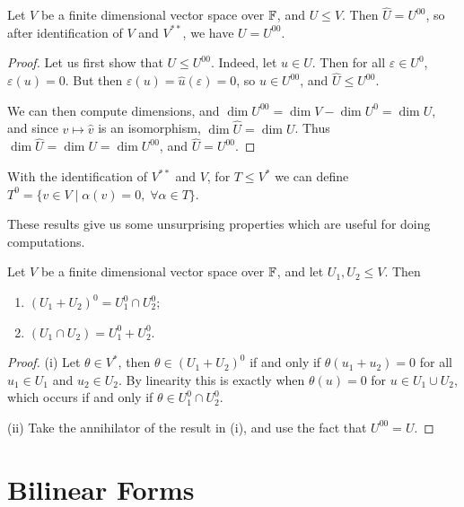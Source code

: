 \documentclass[a4paper]{scrartcl}
\begin{document}
\begin{lemma}
    Let $V$ be a finite dimensional vector space over $\mathbb{F}$, and $U \leq V$. Then
    $\hat{U} = U^{00}$, so after identification of $V$ and $V^{**}$, we have $U = U^{00}$.
\end{lemma}
\begin{proof}
    Let us first show that $U \leq U^{00}$. Indeed, let $u \in U$. Then for all $\varepsilon \in U^0$, $\varepsilon(u) = 0$. But then $\varepsilon(u) = \hat{u}(\varepsilon) = 0$, so $\hat{u} \in U^{00}$, and $\hat{U} \leq U^{00}$.
    
    We can then compute dimensions, and $\dim U^{00} = \dim V - \dim U^{0} = \dim U$, and since $v \mapsto \hat{v}$ is an isomorphism, $\dim \hat{U} = 
    \dim U$. Thus $\dim \hat{U} = \dim U = \dim U^{00}$, and $\hat{U} = U^{00}$.
\end{proof}

\begin{remark}
    With the identification of $V^{**}$ and $V$, for $T \leq V^{*}$ we can define $T^0 = \{v \in V \mid \alpha(v) = 0, \; \forall \alpha \in T\}$.
\end{remark}

These results give us some unsurprising properties which are useful for doing computations.

\begin{lemma}
    Let $V$ be a finite dimensional vector space over $\mathbb{F}$, and let $U_1, U_2 \leq V$. Then 
    \begin{enumerate}[label=(\roman*)]
        \item $(U_1 + U_2)^0 = U_1^0 \cap U_2^0$;
        \item $(U_1 \cap U_2) = U_1^0 + U_2^0$.
    \end{enumerate}
\end{lemma}
\begin{proof}
    (i) Let $\theta \in V^*$, then $\theta \in (U_1 + U_2)^0$ if and only if $\theta(u_1 + u_2) = 0$ for all $u_1 \in U_1$ and $u_2 \in U_2$. By linearity this is exactly when $\theta(u) = 0$ for $u \in U_1 \cup U_2$, which occurs if and only if $\theta \in U_1^0 \cap U_2^0$.

    (ii) Take the annihilator of the result in (i), and use the fact that $U^{00} = U$.
\end{proof}

\section{Bilinear Forms}
\end{document}
